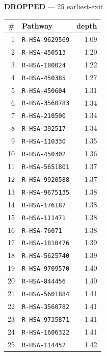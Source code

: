 \documentclass[10pt]{article}
\begin{document}
\begin{minipage}[t]{0.48\textwidth}\centering\textbf{\color{red!60!black}DROPPED} --- 25 earliest-exit\\[3pt]
\begin{tabular}{@{}r l r@{}}
\toprule
\# & Pathway & depth \\
\midrule
1 & \texttt{R-HSA-9629569} & 1.09 \\
2 & \texttt{R-HSA-450513} & 1.20 \\
3 & \texttt{R-HSA-180024} & 1.22 \\
4 & \texttt{R-HSA-450385} & 1.27 \\
5 & \texttt{R-HSA-450604} & 1.31 \\
6 & \texttt{R-HSA-3560783} & 1.34 \\
7 & \texttt{R-HSA-210500} & 1.34 \\
8 & \texttt{R-HSA-392517} & 1.34 \\
9 & \texttt{R-HSA-110330} & 1.35 \\
10 & \texttt{R-HSA-450302} & 1.36 \\
11 & \texttt{R-HSA-5651801} & 1.37 \\
12 & \texttt{R-HSA-9920588} & 1.37 \\
13 & \texttt{R-HSA-9675135} & 1.38 \\
14 & \texttt{R-HSA-176187} & 1.38 \\
15 & \texttt{R-HSA-111471} & 1.38 \\
16 & \texttt{R-HSA-76071} & 1.38 \\
17 & \texttt{R-HSA-1810476} & 1.39 \\
18 & \texttt{R-HSA-5625740} & 1.39 \\
19 & \texttt{R-HSA-9709570} & 1.40 \\
20 & \texttt{R-HSA-844456} & 1.40 \\
21 & \texttt{R-HSA-5601884} & 1.41 \\
22 & \texttt{R-HSA-3560782} & 1.41 \\
23 & \texttt{R-HSA-9735871} & 1.41 \\
24 & \texttt{R-HSA-1606322} & 1.41 \\
25 & \texttt{R-HSA-114452} & 1.42 \\
\bottomrule
\end{tabular}
\end{minipage}
\end{document}
